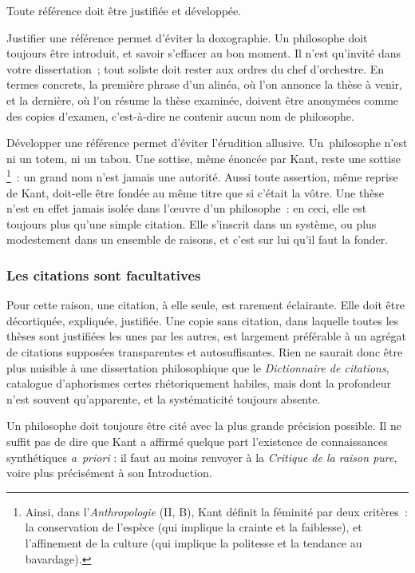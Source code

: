 \documentclass[a4paper,12pt]{article}
\begin{document}
Toute référence doit être justifiée et développée.

Justifier une référence permet d'éviter la doxographie. Un philosophe
doit toujours être introduit, et savoir s'effacer au bon moment. Il
n'est qu'invité dans votre dissertation ; tout soliste doit rester aux
ordres du chef d'orchestre. En termes concrets, la première phrase d'un
alinéa, où l'on annonce la thèse à venir, et la dernière, où l'on résume
la thèse examinée, doivent être anonymées comme des copies d'examen,
c'est-à-dire ne contenir aucun nom de philosophe.

Développer une référence permet d'éviter l'érudition allusive.
Un philosophe n'est ni un totem, ni un tabou. Une sottise, même énoncée
par Kant, reste une sottise \footnote{Ainsi, dans l'\emph{Anthropologie} (II, B), Kant définit la féminité par
deux critères : la conservation de l'espèce (qui implique la crainte
et la faiblesse), et l'affinement de la culture (qui implique la
politesse et la tendance au bavardage).} : un grand nom n'est jamais une
autorité. Aussi toute assertion, même reprise de Kant, doit-elle être
fondée au même titre que si c'était la vôtre. Une thèse n'est en effet
jamais isolée dans l'œuvre d'un philosophe : en ceci, elle est toujours
plus qu'une simple citation. Elle s'inscrit dans un système, ou plus
modestement dans un ensemble de raisons, et c'est sur lui qu'il faut la
fonder.

\subsubsection{Les citations sont facultatives}
\label{sec-3-5-2}

Pour cette raison, une citation, à elle seule, est rarement éclairante.
Elle doit être décortiquée, expliquée, justifiée. Une copie sans
citation, dans laquelle toutes les thèses sont justifiées les unes par
les autres, est largement préférable à un agrégat de citations supposées
transparentes et autosuffisantes. Rien ne saurait donc être plus
nuisible à une dissertation philosophique que le \emph{Dictionnaire de
citations}, catalogue d'aphorismes certes rhétoriquement habiles, mais
dont la profondeur n'est souvent qu'apparente, et la systématicité
toujours absente.

Un philosophe doit toujours être cité avec la plus grande précision
possible. Il ne suffit pas de dire que Kant a affirmé quelque part
l'existence de connaissances synthétiques \emph{a priori} : il faut au moins
renvoyer à la \emph{Critique de la raison pure}, voire plus précisément à son
Introduction.
\end{document}
